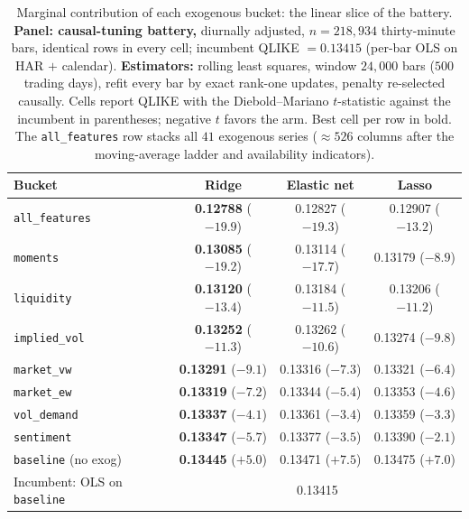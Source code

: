 \begin{table}[H]
\centering
\small
\setlength{\tabcolsep}{4pt}
\caption{Marginal contribution of each exogenous bucket: the linear slice of the battery.
\textbf{Panel: causal-tuning battery,} diurnally adjusted, $n = 218{,}934$ thirty-minute
bars, identical rows in every cell; incumbent QLIKE $= 0.13415$ (per-bar OLS on HAR $+$
calendar). \textbf{Estimators:} rolling least squares, window $24{,}000$ bars ($500$
trading days), refit every bar by exact rank-one updates, penalty re-selected causally.
Cells report QLIKE with the Diebold--Mariano $t$-statistic against the incumbent in
parentheses; negative $t$ favors the arm. Best cell per row in bold. The
\texttt{all\_features} row stacks all $41$ exogenous series
($\approx 526$ columns after the moving-average ladder and availability indicators).}
\label{tab:marginal_buckets_wf}
\begin{tabular}{@{}lccc@{}}
\toprule
Bucket & Ridge & Elastic net & Lasso \\
\midrule
\texttt{all\_features} & \textbf{0.12788} ($-19.9$) & 0.12827 ($-19.3$) & 0.12907 ($-13.2$) \\
\texttt{moments}       & \textbf{0.13085} ($-19.2$) & 0.13114 ($-17.7$) & 0.13179 ($-8.9$) \\
\texttt{liquidity}     & \textbf{0.13120} ($-13.4$) & 0.13184 ($-11.5$) & 0.13206 ($-11.2$) \\
\texttt{implied\_vol}  & \textbf{0.13252} ($-11.3$) & 0.13262 ($-10.6$) & 0.13274 ($-9.8$) \\
\texttt{market\_vw}    & \textbf{0.13291} ($-9.1$)  & 0.13316 ($-7.3$)  & 0.13321 ($-6.4$) \\
\texttt{market\_ew}    & \textbf{0.13319} ($-7.2$)  & 0.13344 ($-5.4$)  & 0.13353 ($-4.6$) \\
\texttt{vol\_demand}   & \textbf{0.13337} ($-4.1$)  & 0.13361 ($-3.4$)  & 0.13359 ($-3.3$) \\
\texttt{sentiment}     & \textbf{0.13347} ($-5.7$)  & 0.13377 ($-3.5$)  & 0.13390 ($-2.1$) \\
\midrule
\texttt{baseline} (no exog) & \textbf{0.13445} ($+5.0$) & 0.13471 ($+7.5$) & 0.13475 ($+7.0$) \\
Incumbent: OLS on \texttt{baseline} & \multicolumn{3}{c}{0.13415} \\
\bottomrule
\end{tabular}
\end{table}

